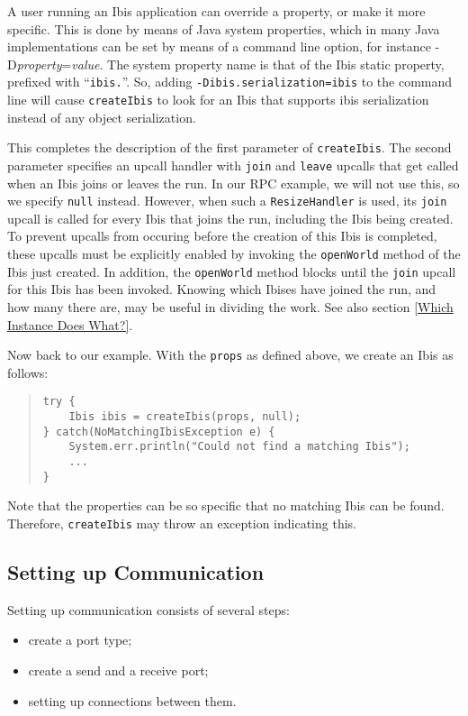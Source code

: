 \documentclass[10pt]{article}
\begin{document}
A user running an Ibis application can override a property, or make it
more specific. This is done by means of Java system properties, which
in many Java implementations can be set by means of a command line option,
for instance -D\emph{property}=\emph{value}.
The system property name is that of the Ibis static property, prefixed
with ``\verb+ibis.+''.
So, adding \verb+-Dibis.serialization=ibis+ to the command line will
cause \verb+createIbis+ to look for an Ibis that supports ibis serialization
instead of any object serialization.

This completes the description of the first parameter
of \verb+createIbis+. The second parameter specifies an upcall handler
with \verb+join+ and \verb+leave+ upcalls that get called when an Ibis
joins or leaves the run.
In our RPC example, we will not use this, so we specify \verb+null+
instead.
However, when such a \verb+ResizeHandler+ is used, its \verb+join+
upcall is called for every Ibis that joins the run, including the
Ibis being created.
To prevent upcalls from occuring before the
creation of this Ibis is completed, these upcalls must be explicitly
enabled by invoking the \verb+openWorld+ method of the Ibis just
created. In addition, the \verb+openWorld+ method blocks until the
\verb+join+ upcall for this Ibis has been invoked.
Knowing which Ibises have joined the run, and how many there are, may
be useful in dividing the work. See also section \ref{Which Instance Does What?}.

Now back to our example. 
With the \verb+props+ as defined above, we create an Ibis as follows:
\begin{quote}
\begin{verbatim}
try {
    Ibis ibis = createIbis(props, null);
} catch(NoMatchingIbisException e) {
    System.err.println("Could not find a matching Ibis");
    ...
}
\end{verbatim}
\end{quote}
Note that the properties can be so specific that no matching Ibis
can be found. Therefore, \verb+createIbis+ may throw an exception
indicating this.

\subsection{Setting up Communication}

Setting up communication consists of several steps:
\begin{itemize}
\item
create a port type;
\item
create a send and a receive port;
\item
setting up connections between them.
\end{itemize}
\end{document}
